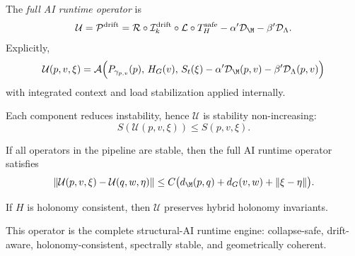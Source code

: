 \begin{definition}
The \emph{full AI runtime operator} is
\[
\mathcal{U}
= \mathcal{P}^\mathrm{drift}
= \mathcal{R} \circ \mathcal{I}_k^\mathrm{drift}
\circ \mathcal{L} \circ T_H^\mathrm{safe}
- \alpha' \mathcal{D}_\M
- \beta' \mathcal{D}_\Lambda.
\]
Explicitly,
\[
\mathcal{U}(p,v,\xi)
= \mathcal{A}\Big(
P_{\gamma_{p,v}}(p),\,
H_G(v),\,
S_t(\xi)
- \alpha' \mathcal{D}_\M(p,v)
- \beta' \mathcal{D}_\Lambda(p,v)
\Big)
\]
with integrated context and load stabilization applied internally.
\end{definition}

\begin{lemma}
Each component reduces instability, hence $\mathcal{U}$ is stability
non-increasing:
\[
S(\mathcal{U}(p,v,\xi)) \le S(p,v,\xi).
\]
\end{lemma}

\begin{theorem}
If all operators in the pipeline are stable, then the full AI runtime
operator satisfies
\[
\| \mathcal{U}(p,v,\xi) - \mathcal{U}(q,w,\eta) \|
\le C \big( d_\M(p,q) + d_G(v,w) + \|\xi - \eta\| \big).
\]
\end{theorem}

\begin{lemma}
If $H$ is holonomy consistent, then $\mathcal{U}$ preserves hybrid holonomy
invariants.
\end{lemma}

\begin{remark}
This operator is the complete structural-AI runtime engine: collapse-safe,
drift-aware, holonomy-consistent, spectrally stable, and geometrically
coherent.
\end{remark}
